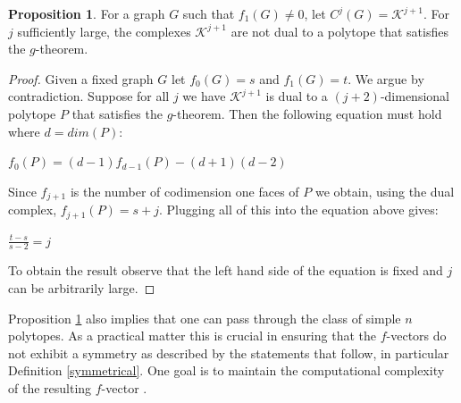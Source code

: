 \documentclass[oneside,12pt]{amsart}
\theoremstyle{definition}
\newtheorem{Proposition}[Theorem]{Proposition}
\numberwithin{equation}{section}
\begin{document}

\begin{Proposition}\label{No g Theorem}
For a graph $G$ such that $f_1(G) \neq 0$, let $C^{j}(G) = \mathcal{K}^{j+1}$. For $j$ sufficiently large, the complexes $\mathcal{K}^{j+1}$ are not dual to a polytope that satisfies the $g$-theorem.
\end{Proposition}

\begin{proof}

Given a fixed graph $G$ let $f_0(G) = s$ and $f_1(G) = t$.  We argue by contradiction.  Suppose for all $j$ we have $\mathcal{K}^{j+1}$ is dual to a $(j+2)$-dimensional polytope $P$ that satisfies the $g$-theorem.  Then the following equation must hold where $d = dim(P)$:

\begin{center}
$f_0(P) = (d-1)f_{d-1}(P) - (d+1)(d-2)$
\end{center}

Since $f_{j+1}$ is the number of codimension one faces of $P$ we obtain, using the dual complex, $f_{j+1}(P) = s+j$.  Plugging all of this into the equation above
gives:

\begin{center}
$\displaystyle \frac{t-s}{s-2} = j$
\end{center}

To obtain the result observe that the left hand side of the equation is fixed and $j$ can be arbitrarily large.



\end{proof}

Proposition \ref{No g Theorem} also implies that one can pass through the class of simple $n$ polytopes. As a practical matter this is crucial in ensuring that the $f$-vectors do not exhibit a symmetry as described by the statements that follow, in particular Definition \ref{symmetrical}.  One goal is to maintain the computational complexity of the resulting $f$-vector \cite{KP}.



\end{document}
